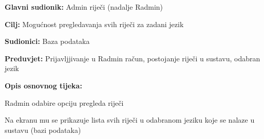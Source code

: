 \noindent {}
\begin{packed_item}

	\item \textbf{Glavni sudionik: } Admin riječi (nadalje Radmin)
	\item \textbf{Cilj: } Mogućnost pregledavanja svih riječi za zadani jezik
	\item \textbf{Sudionici: } Baza podataka
	\item \textbf{Preduvjet: } Prijavljjivanje u Radmin račun, postojanje riječi u sustavu, odabran jezik
	\item  \textbf{Opis osnovnog tijeka:}
	
	\item[] \begin{packed_enum}
		
		\item Radmin odabire opciju pregleda riječi
		\item Na ekranu mu se prikazuje lista svih riječi u odabranom jeziku koje se nalaze u sustavu (bazi podataka)

	\end{packed_enum}
	
\end{packed_item}

